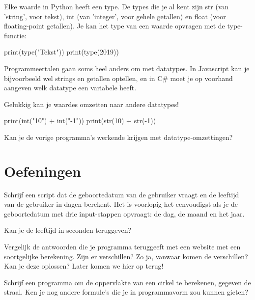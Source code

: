 \documentclass[10pt,a4paper]{article}
\newenvironment{task}{\smallpencil}{}
\begin{document}
Elke waarde in Python heeft een type. De types die je al kent zijn str (van 'string', voor tekst), int (van 'integer', voor gehele getallen) en float (voor floating-point getallen). Je kan het type van een waarde opvragen met de type-functie:
\begin{python}
print(type("Tekst"))
print(type(2019))
\end{python}

Programmeertalen gaan soms heel anders om met datatypes. In Javascript kan je bijvoorbeeld wel strings en getallen optellen, en in C\# moet je op voorhand aangeven welk datatype een variabele heeft.

Gelukkig kan je waardes omzetten naar andere datatypes!
\begin{python}
print(int("10") + int("-1"))
print(str(10) + str(-1))
\end{python}

\begin{task}
Kan je de vorige programma's werkende krijgen met datatype-omzettingen?
\end{task}

\section{Oefeningen}
\begin{task}
Schrijf een script dat de geboortedatum van de gebruiker vraagt en de leeftijd van de gebruiker in dagen berekent. Het is voorlopig het eenvoudigst als je de geboortedatum met drie input-stappen opvraagt: de dag, de maand en het jaar.
\end{task}

\begin{task}
Kan je de leeftijd in seconden teruggeven?
\end{task}

\begin{task}
Vergelijk de antwoorden die je programma teruggeeft met een website met een soortgelijke berekening. Zijn er verschillen? Zo ja, vanwaar komen de verschillen? Kan je deze oplossen? Later komen we hier op terug!
\end{task}

\begin{task}
Schrijf een programma om de oppervlakte van een cirkel te berekenen, gegeven de straal. Ken je nog andere formule's die je in programmavorm zou kunnen gieten?
\end{task}
\end{document}
